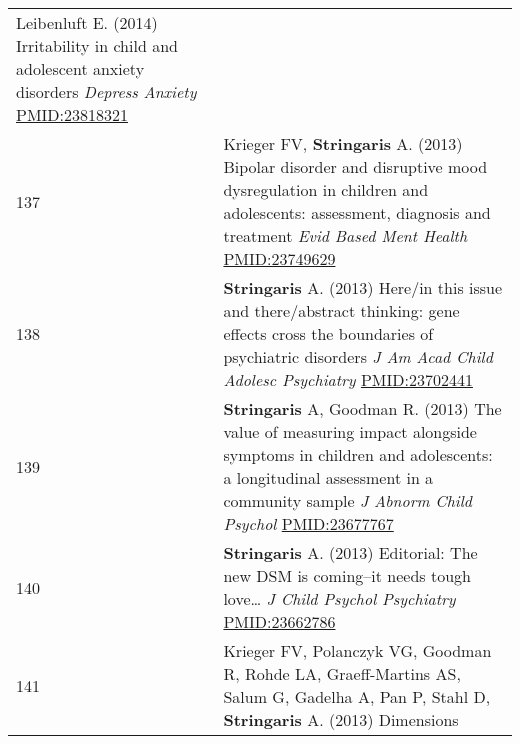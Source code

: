 \documentclass[
]{article}
\begin{document}
\begin{longtable}[]{@{}ll@{}}
\begin{minipage}[t]{0.94\columnwidth}
Leibenluft E. (2014) Irritability in child and adolescent anxiety
disorders \emph{Depress Anxiety} \url{PMID:23818321}\strut
\end{minipage}\tabularnewline
\begin{minipage}[t]{0.01\columnwidth}\raggedright
137\strut
\end{minipage} & \begin{minipage}[t]{0.94\columnwidth}\raggedright
Krieger FV, \textbf{Stringaris} A. (2013) Bipolar disorder and
disruptive mood dysregulation in children and adolescents: assessment,
diagnosis and treatment \emph{Evid Based Ment Health}
\url{PMID:23749629}\strut
\end{minipage}\tabularnewline
\begin{minipage}[t]{0.01\columnwidth}\raggedright
138\strut
\end{minipage} & \begin{minipage}[t]{0.94\columnwidth}\raggedright
\textbf{Stringaris} A. (2013) Here/in this issue and there/abstract
thinking: gene effects cross the boundaries of psychiatric disorders
\emph{J Am Acad Child Adolesc Psychiatry} \url{PMID:23702441}\strut
\end{minipage}\tabularnewline
\begin{minipage}[t]{0.01\columnwidth}\raggedright
139\strut
\end{minipage} & \begin{minipage}[t]{0.94\columnwidth}\raggedright
\textbf{Stringaris} A, Goodman R. (2013) The value of measuring impact
alongside symptoms in children and adolescents: a longitudinal
assessment in a community sample \emph{J Abnorm Child Psychol}
\url{PMID:23677767}\strut
\end{minipage}\tabularnewline
\begin{minipage}[t]{0.01\columnwidth}\raggedright
140\strut
\end{minipage} & \begin{minipage}[t]{0.94\columnwidth}\raggedright
\textbf{Stringaris} A. (2013) Editorial: The new DSM is coming--it needs
tough love\ldots{} \emph{J Child Psychol Psychiatry}
\url{PMID:23662786}\strut
\end{minipage}\tabularnewline
\begin{minipage}[t]{0.01\columnwidth}\raggedright
141\strut
\end{minipage} & \begin{minipage}[t]{0.94\columnwidth}\raggedright
Krieger FV, Polanczyk VG, Goodman R, Rohde LA, Graeff-Martins AS, Salum
G, Gadelha A, Pan P, Stahl D, \textbf{Stringaris} A. (2013) Dimensions

\end{minipage}
\end{longtable}
\end{document}
